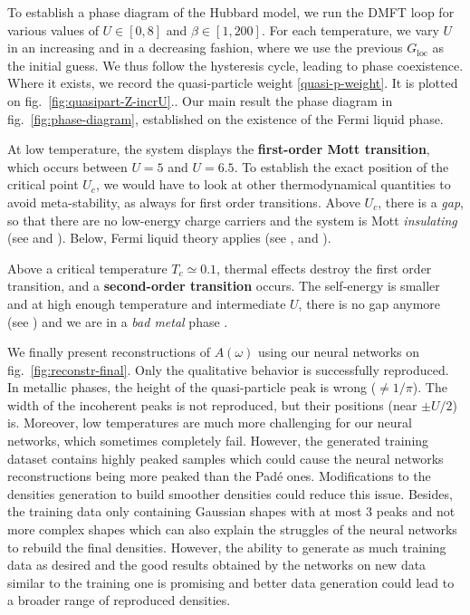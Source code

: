 \documentclass[reprint,amsmath,amssymb,aps,pra]{revtex4-2}
\begin{document}
To establish a phase diagram of the Hubbard model, we run the DMFT loop for various values of $U\in[0,8]$ and $\beta\in[1,200]$. For each temperature, we vary $U$ in an increasing and in a decreasing fashion, where we use the previous $G_\text{loc}$ as the initial guess. We thus follow the hysteresis cycle, leading to phase coexistence. Where it exists, we record the quasi-particle weight \eqref{quasi-p-weight}. It is plotted on fig.~\ref{fig:quasipart-Z-incrU}.. Our main result the phase diagram in fig.~\ref{fig:phase-diagram}, established on the existence of the Fermi liquid phase.

At low temperature, the system displays the \textbf{first-order Mott transition}, which occurs between $U=5$ and $U=6.5$. To establish the exact position of the critical point $U_c$, we would have to look at other thermodynamical quantities to avoid meta-stability, as always for first order transitions. Above $U_c$, there is a \emph{gap}, so that there are no low-energy charge carriers and the system is Mott \emph{insulating} (see  and ). Below, Fermi liquid theory applies (see ,  and ).

Above a critical temperature $T_c\simeq 0.1$, thermal effects destroy the first order transition, and a \textbf{second-order transition} occurs. The self-energy is smaller and at high enough temperature and intermediate $U$, there is no gap anymore (see ) and we are in a \emph{bad metal} phase \cite{Georges_2004}.

We finally present reconstructions of $A(\omega)$ using our neural networks on fig.~\ref{fig:reconstr-final}. Only the qualitative behavior is successfully reproduced. In metallic phases, the height of the quasi-particle peak is wrong ($\neq 1/\pi$). The width of the incoherent peaks is not reproduced, but their positions (near $\pm U/2$) is. Moreover, low temperatures are much more challenging for our neural networks, which sometimes completely fail. However, the generated training dataset contains highly peaked samples which could cause the neural networks reconstructions being more peaked than the Padé ones. Modifications to the densities generation to build smoother densities could reduce this issue. Besides, the training data only containing Gaussian shapes with at most 3 peaks and not more complex shapes which can also explain the struggles of the neural networks to rebuild the final densities. However, the ability to generate as much training data as desired and the good results obtained by the networks on new data similar to the training one is promising and better data generation could lead to a broader range of reproduced densities.
\end{document}
